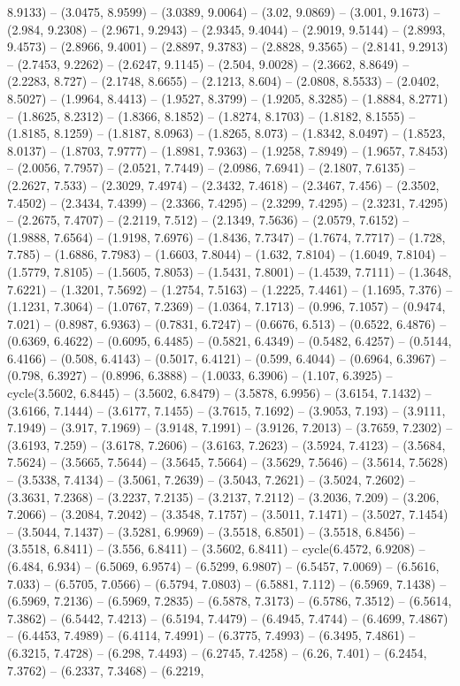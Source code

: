 8.9133) -- (3.0475, 8.9599) -- (3.0389, 9.0064) -- (3.02, 9.0869) -- (3.001, 9.1673) -- (2.984, 9.2308) -- (2.9671, 9.2943) -- (2.9345, 9.4044) -- (2.9019, 9.5144) -- (2.8993, 9.4573) -- (2.8966, 9.4001) -- (2.8897, 9.3783) -- (2.8828, 9.3565) -- (2.8141, 9.2913) -- (2.7453, 9.2262) -- (2.6247, 9.1145) -- (2.504, 9.0028) -- (2.3662, 8.8649) -- (2.2283, 8.727) -- (2.1748, 8.6655) -- (2.1213, 8.604) -- (2.0808, 8.5533) -- (2.0402, 8.5027) -- (1.9964, 8.4413) -- (1.9527, 8.3799) -- (1.9205, 8.3285) -- (1.8884, 8.2771) -- (1.8625, 8.2312) -- (1.8366, 8.1852) -- (1.8274, 8.1703) -- (1.8182, 8.1555) -- (1.8185, 8.1259) -- (1.8187, 8.0963) -- (1.8265, 8.073) -- (1.8342, 8.0497) -- (1.8523, 8.0137) -- (1.8703, 7.9777) -- (1.8981, 7.9363) -- (1.9258, 7.8949) -- (1.9657, 7.8453) -- (2.0056, 7.7957) -- (2.0521, 7.7449) -- (2.0986, 7.6941) -- (2.1807, 7.6135) -- (2.2627, 7.533) -- (2.3029, 7.4974) -- (2.3432, 7.4618) -- (2.3467, 7.456) -- (2.3502, 7.4502) -- (2.3434, 7.4399) -- (2.3366, 7.4295) -- (2.3299, 7.4295) -- (2.3231, 7.4295) -- (2.2675, 7.4707) -- (2.2119, 7.512) -- (2.1349, 7.5636) -- (2.0579, 7.6152) -- (1.9888, 7.6564) -- (1.9198, 7.6976) -- (1.8436, 7.7347) -- (1.7674, 7.7717) -- (1.728, 7.785) -- (1.6886, 7.7983) -- (1.6603, 7.8044) -- (1.632, 7.8104) -- (1.6049, 7.8104) -- (1.5779, 7.8105) -- (1.5605, 7.8053) -- (1.5431, 7.8001) -- (1.4539, 7.7111) -- (1.3648, 7.6221) -- (1.3201, 7.5692) -- (1.2754, 7.5163) -- (1.2225, 7.4461) -- (1.1695, 7.376) -- (1.1231, 7.3064) -- (1.0767, 7.2369) -- (1.0364, 7.1713) -- (0.996, 7.1057) -- (0.9474, 7.021) -- (0.8987, 6.9363) -- (0.7831, 6.7247) -- (0.6676, 6.513) -- (0.6522, 6.4876) -- (0.6369, 6.4622) -- (0.6095, 6.4485) -- (0.5821, 6.4349) -- (0.5482, 6.4257) -- (0.5144, 6.4166) -- (0.508, 6.4143) -- (0.5017, 6.4121) -- (0.599, 6.4044) -- (0.6964, 6.3967) -- (0.798, 6.3927) -- (0.8996, 6.3888) -- (1.0033, 6.3906) -- (1.107, 6.3925) -- cycle(3.5602, 6.8445) -- (3.5602, 6.8479) -- (3.5878, 6.9956) -- (3.6154, 7.1432) -- (3.6166, 7.1444) -- (3.6177, 7.1455) -- (3.7615, 7.1692) -- (3.9053, 7.193) -- (3.9111, 7.1949) -- (3.917, 7.1969) -- (3.9148, 7.1991) -- (3.9126, 7.2013) -- (3.7659, 7.2302) -- (3.6193, 7.259) -- (3.6178, 7.2606) -- (3.6163, 7.2623) -- (3.5924, 7.4123) -- (3.5684, 7.5624) -- (3.5665, 7.5644) -- (3.5645, 7.5664) -- (3.5629, 7.5646) -- (3.5614, 7.5628) -- (3.5338, 7.4134) -- (3.5061, 7.2639) -- (3.5043, 7.2621) -- (3.5024, 7.2602) -- (3.3631, 7.2368) -- (3.2237, 7.2135) -- (3.2137, 7.2112) -- (3.2036, 7.209) -- (3.206, 7.2066) -- (3.2084, 7.2042) -- (3.3548, 7.1757) -- (3.5011, 7.1471) -- (3.5027, 7.1454) -- (3.5044, 7.1437) -- (3.5281, 6.9969) -- (3.5518, 6.8501) -- (3.5518, 6.8456) -- (3.5518, 6.8411) -- (3.556, 6.8411) -- (3.5602, 6.8411) -- cycle(6.4572, 6.9208) -- (6.484, 6.934) -- (6.5069, 6.9574) -- (6.5299, 6.9807) -- (6.5457, 7.0069) -- (6.5616, 7.033) -- (6.5705, 7.0566) -- (6.5794, 7.0803) -- (6.5881, 7.112) -- (6.5969, 7.1438) -- (6.5969, 7.2136) -- (6.5969, 7.2835) -- (6.5878, 7.3173) -- (6.5786, 7.3512) -- (6.5614, 7.3862) -- (6.5442, 7.4213) -- (6.5194, 7.4479) -- (6.4945, 7.4744) -- (6.4699, 7.4867) -- (6.4453, 7.4989) -- (6.4114, 7.4991) -- (6.3775, 7.4993) -- (6.3495, 7.4861) -- (6.3215, 7.4728) -- (6.298, 7.4493) -- (6.2745, 7.4258) -- (6.26, 7.401) -- (6.2454, 7.3762) -- (6.2337, 7.3468) -- (6.2219, 